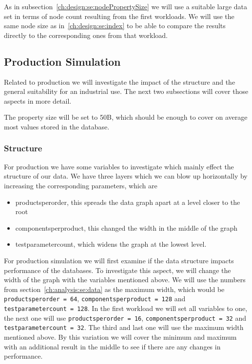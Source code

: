 As in subsection~\ref{ch:design:se:nodePropertySize} we will use a suitable large data set in terms of node count resulting from the first workloads.
We will use the same node size as in~\ref{ch:design:se:index} to be able to compare the results directly to the corresponding ones from that workload.

\subsection{Production Simulation}
\label{ch:design:se:productionSimulation}
Related to production we will investigate the impact of the structure and the general suitability for an industrial use.
The next two subsections will cover those aspects in more detail.

The property size will be set to 50B,
which should be enough to cover on average most values stored in the database.

\subsubsection{Structure}
For production we have some variables to investigate which mainly effect the structure of our data.
We have three layers which we can blow up horizontally by increasing the corresponding parameters,
which are

\begin{itemize}
  \item productsperorder, this spreads the data graph apart at a level closer to the root
  \item componentsperproduct, this changed the width in the middle of the graph
  \item testparametercount, which widens the graph at the lowest level.
\end{itemize}

For production simulation we will first examine if the data structure impacts performance of the databases.
To investigate this aspect,
we will change the width of the graph with the variables mentioned above.
We will use the numbers from section~\ref{ch:analysis:se:data} as the maximum width,
which would be \texttt{productsperorder = 64},
\texttt{componentsperproduct = 128} and \texttt{testparametercount = 128}.
In the first workload we will set all variables to one,
the next one will use \texttt{productsperorder = 16},
\texttt{componentsperproduct = 32} and \texttt{testparametercount = 32}.
The third and last one will use the maximum width mentioned above.
By this variation we will cover the minimum and maximum with an additional result in the middle to see if there are any changes in performance.

